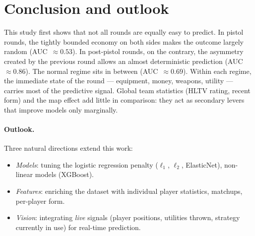 \section{Conclusion and outlook}
\label{sec:conclusion}

This study first shows that not all rounds are equally easy to
predict. In pistol rounds, the tightly bounded economy on both sides
makes the outcome largely random (AUC~$\approx 0.53$). In post-pistol
rounds, on the contrary, the asymmetry created by the previous round
allows an almost deterministic prediction (AUC~$\approx 0.86$). The
normal regime sits in between (AUC~$\approx 0.69$). Within each
regime, the immediate state of the round --- equipment, money, weapons,
utility --- carries most of the predictive signal. Global team
statistics (HLTV rating, recent form) and the map effect add little
in comparison: they act as secondary levers that improve models only
marginally.

\paragraph{Outlook.}
Three natural directions extend this work:
\begin{itemize}
  \item \emph{Models}: tuning the logistic regression penalty
    ($\ell_1$, $\ell_2$, ElasticNet), non-linear models (XGBoost).
  \item \emph{Features}: enriching the dataset with individual player
    statistics, matchups, per-player form.
  \item \emph{Vision}: integrating \emph{live} signals (player
    positions, utilities thrown, strategy currently in use) for
    real-time prediction.
\end{itemize}

